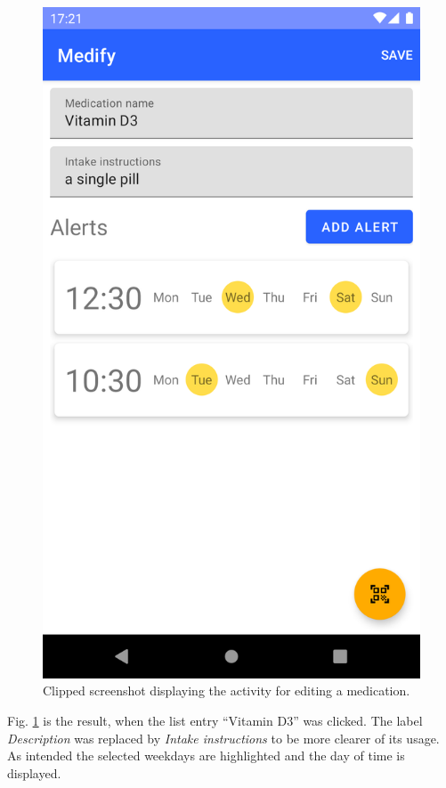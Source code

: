 \documentclass[conference]{IEEEtran}
\begin{document}
\begin{figure}[H]
	\centerline{\includegraphics[trim={0 720px 0 0},clip,width=0.8\linewidth]{images/screenshots/editing_medication.png}}
	\caption{Clipped screenshot displaying the activity for editing a medication.}
	\label{fig:editing_medication}
\end{figure}

Fig. \ref{fig:editing_medication} is the result, when the list entry ``Vitamin D3'' was clicked. The label
\textit{Description} was replaced by \textit{Intake instructions} to be more clearer of its usage. As intended the
selected weekdays are highlighted and the day of time is displayed.
\end{document}
